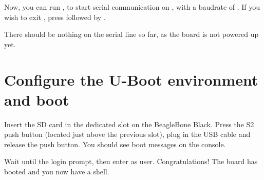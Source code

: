 Now, you can run , to start serial
communication on , with a baudrate of . If
you wish to exit , press \code{[Ctrl][a]} followed by
\code{[Ctrl][x]}.

There should be nothing on the serial line so far, as the board is not
powered up yet.

\section{Configure the U-Boot environment and boot}

Insert the SD card in the dedicated slot on the BeagleBone Black. Press the S2
push button (located just above the previous slot), plug in the USB cable and
release the push button. You should see boot messages on the console.

Wait until the login prompt, then enter  as user.
Congratulations! The board has booted and you now have a shell.
